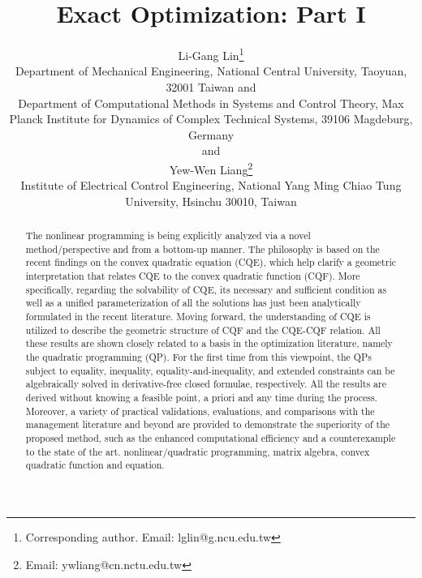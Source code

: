 \documentclass{imaman}
\numberwithin{equation}{section}
\begin{document}

\thispagestyle{empty}

\title{Exact Optimization: Part I}
\author{ {\sc
Li-Gang Lin\thanks{Corresponding author. Email: lglin@g.ncu.edu.tw}} \\[2pt]
Department of Mechanical Engineering, National Central University, Taoyuan, 32001 Taiwan and\\
Department of Computational Methods in Systems and Control Theory, Max Planck Institute for Dynamics of Complex Technical Systems, 39106 Magdeburg, Germany\\[6pt]
{\sc and}\\[6pt]
{\sc Yew-Wen Liang}\thanks{Email: ywliang@cn.nctu.edu.tw}\\[2pt]
Institute of Electrical Control Engineering, National Yang Ming Chiao Tung University, Hsinchu 30010, Taiwan
}
\pagestyle{headings}
\maketitle

\begin{abstract}
{The nonlinear programming is being explicitly analyzed via a novel method/perspective and from a bottom-up manner. The philosophy is based on the recent findings on the convex quadratic equation (CQE), which help clarify a geometric interpretation that relates CQE to the convex quadratic function (CQF). More specifically, regarding the solvability of CQE, its necessary and sufficient condition as well as a unified parameterization of all the solutions has just been analytically formulated in the recent literature. Moving forward, the understanding of CQE is utilized to describe the geometric structure of CQF and the CQE-CQF relation. All these results are shown closely related to a basis in the optimization literature, namely the quadratic programming (QP). For the first time from this viewpoint, the QPs subject to equality, inequality, equality-and-inequality, and extended constraints can be algebraically solved in derivative-free closed formulae, respectively. All the results are derived without knowing a feasible point, a priori and any time during the process. Moreover, a variety of practical validations, evaluations, and comparisons with the management literature and beyond are provided to demonstrate the superiority of the proposed method, such as the enhanced computational efficiency and a counterexample to the state of the art.}
{nonlinear/quadratic programming, matrix algebra, convex quadratic function and equation.}
\end{abstract}
\end{document}
